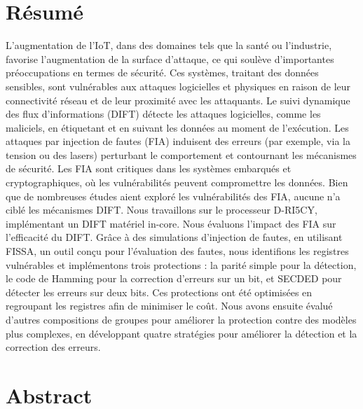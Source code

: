 \chapter*{Résumé}
\label{chapter:resume}

L'augmentation de l'IoT, dans des domaines tels que la santé ou l'industrie, favorise l'augmentation de la surface d'attaque, ce qui soulève d'importantes préoccupations en termes de sécurité. Ces systèmes, traitant des données sensibles, sont vulnérables aux attaques logicielles et physiques en raison de leur connectivité réseau et de leur proximité avec les attaquants.
Le suivi dynamique des flux d'informations (DIFT) détecte les attaques logicielles, comme les maliciels, en étiquetant et en suivant les données au moment de l'exécution. Les attaques par injection de fautes (FIA) induisent des erreurs (par exemple, via la tension ou des lasers) perturbant le comportement et contournant les mécanismes de sécurité. Les FIA sont critiques dans les systèmes embarqués et cryptographiques, où les vulnérabilités peuvent compromettre les données. Bien que de nombreuses études aient exploré les vulnérabilités des FIA, aucune n'a ciblé les mécanismes DIFT.
Nous travaillons sur le processeur D-RI5CY, implémentant un DIFT matériel in-core. Nous évaluons l'impact des FIA sur l'efficacité du DIFT. Grâce à des simulations d'injection de fautes, en utilisant FISSA, un outil conçu pour l'évaluation des fautes, nous identifions les registres vulnérables et implémentons trois protections : la parité simple pour la détection, le code de Hamming pour la correction d'erreurs sur un bit, et SECDED pour détecter les erreurs sur deux bits. Ces protections ont été optimisées en regroupant les registres afin de minimiser le coût. Nous avons ensuite évalué d'autres compositions de groupes pour améliorer la protection contre des modèles plus complexes, en développant quatre stratégies pour améliorer la détection et la correction des erreurs.

\chapter*{Abstract}
\label{chapter:abstract}

